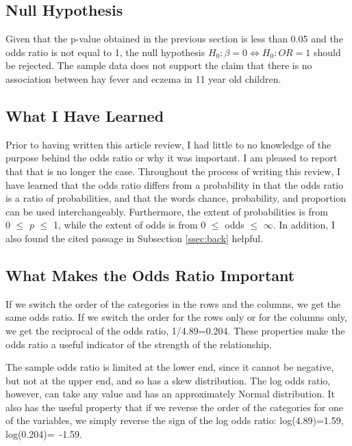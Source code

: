 \documentclass{article}
\begin{document}
	\subsection{Null Hypothesis}
	
Given that the p-value obtained in the previous section is less than 0.05 and the odds ratio is not equal to 1, the null hypothesis $H_0 : \beta = 0 \Leftrightarrow H_0 : OR = 1$ should be rejected. The sample data does not support the claim that there is no association between hay fever and eczema in 11 year old children.

	\subsection{What I Have Learned}
	
Prior to having written this article review, I had little to no knowledge of the purpose behind the odds ratio or why it was important. I am pleased to report that that is no longer the case. Throughout the process of writing this review, I have learned that the odds ratio differs from a probability in that the odds ratio is a ratio of probabilities, and that the words chance, probability, and proportion can be used interchangeably. Furthermore, the extent of probabilities is from\\ 0 $\leq$ $p$ $\leq$ 1, while the extent of odds is from 0 $\leq$ odds $\leq$ $\infty$. In addition, I also found the cited passage in Subsection \ref{ssec:back} helpful. 
	
	\subsection{What Makes the Odds Ratio Important}

If we switch the order of the categories in the rows and the columns, we get the same odds ratio. If we switch the order for the rows only or for the columns only, we get the reciprocal of the odds ratio, 1/4.89=0.204. These properties make the odds ratio a useful indicator of the strength of the relationship.\cite{BMJ:1}

\vspace{1 pc}

The sample odds ratio is limited at the lower end, since it cannot be negative, but not at the upper end, and so has a skew distribution. The log odds ratio,\cite{BMJ:3} however, can take any value and has an approximately Normal distribution. It also has the useful property that if we reverse the order of the categories for one of the variables, we simply reverse the sign of the log odds ratio: log(4.89)=1.59, log(0.204)=\ -1.59.\cite{BMJ:1} 
\iffalse	
	\begin{figure}
	\centering
		\texttt{[image: AM\_Processes.png]}
	\caption{\label{fig:3d} Three-dimensional printing processes. From \cite{wong2012review}. Adapted from \cite{kruth1991material}.}
	\end{figure}
\fi
\vspace{1 pc}
	
\end{document}
